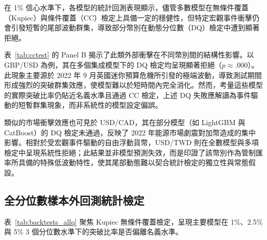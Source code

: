 在 1\% 信心水準下，各模型的統計回測表現顯示，儘管多數模型在無條件覆蓋（Kupiec）與條件覆蓋（CC）檢定上具備一定的穩健性，但特定宏觀事件衝擊仍會引發短暫的尾部波動群集，導致部分幣別在動態分位數（DQ）檢定中遭到顯著拒絕。

表~\ref{tab:cctest} 的 Panel B 揭示了此類外部衝擊在不同幣別間的結構性影響。以 GBP/USD 為例，其在多個集成模型下的 DQ 檢定均呈現顯著拒絕（$p \approx .000$）。此現象主要源於 2022 年 9 月英國迷你預算危機所引發的極端波動，導致測試期間形成強烈的突破群集效應，使模型難以於短時間內完全消化。然而，考量這些模型的實際突破比率仍貼近名義水準且通過 CC 檢定，上述 DQ 失敗應解讀為事件驅動的短暫群集現象，而非系統性的模型設定偏誤。

類似的市場衝擊效應也可見於 USD/CAD，其在部分模型（如 LightGBM 與 CatBoost）的 DQ 檢定未通過，反映了 2022 年能源市場劇震對加幣造成的集中影響。相對於受宏觀事件驅動的自由浮動貨幣，USD/TWD 則在全數模型與多項檢定中呈現系統性拒絕；此結果並非模型預測失效，而是印證了該幣別作為管制匯率所具備的特殊低波動特性，使其尾部動態難以契合統計檢定的獨立性與常態假設。


\subsection{全分位數樣本外回測統計檢定}
\label{sec:backtests_allq}

表~\ref{tab:backtests_allq} 聚焦 Kupiec 無條件覆蓋檢定，呈現主要模型在 1\%、2.5\% 與 5\% 3 個分位數水準下的突破比率是否偏離名義水準。

